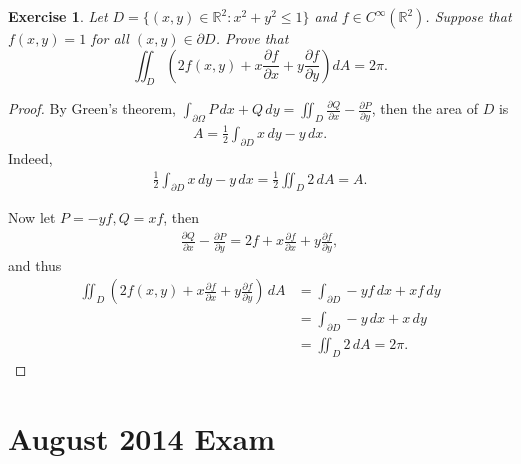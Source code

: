 \documentclass[11pt]{article}
\newtheorem{exercise}{Exercise}[section]
\theoremstyle{definition}
\numberwithin{equation}{subsection}
\begin{document}
\begin{exercise}
Let $D =\{(x, y)\in\mathbb{R}^2 : x^2 + y^2\leq 1\}$ and $f\in C^\infty(\mathbb{R}^2)$. Suppose that $f(x, y) = 1$ for all
$(x, y)\in\partial D$. Prove that
$$
\iint_D \left(2f(x,y)+x\frac{\partial f}{\partial x}+y\frac{\partial f}{\partial y}\right)dA=2\pi.
$$
\end{exercise}
\begin{proof}
By Green's theorem, $\displaystyle \int_{\partial \Omega} P\, dx + Q\, dy = \iint_D \frac{\partial Q}{\partial x} - \frac{\partial P}{\partial y}$, then the area of $D$ is 
\begin{align*}
    A = \frac{1}{2} \int_{\partial D} x\, dy - y\, dx.
\end{align*}
Indeed, 
\begin{align*}
    \frac{1}{2} \int_{\partial D} x\, dy - y\, dx = \frac{1}{2} \iint_D 2\, dA = A.
\end{align*}

Now let $P = -yf, Q = xf$, then 
\begin{align*}
    \frac{\partial Q}{\partial x} - \frac{\partial P}{\partial y} = 2f + x \frac{\partial f}{\partial x} + y \frac{\partial f}{\partial y},
\end{align*}
and thus
\begin{align*}
    \iint_D \left(2f(x,y)+x\frac{\partial f}{\partial x}+y\frac{\partial f}{\partial y}\right)\, dA & = \int_{\partial D} -yf\, dx + x f\, dy \\
    & = \int_{\partial D} -y \, dx + x \, dy \\
    & = \iint_D 2\, dA = 2\pi.
\end{align*}
\end{proof}


\newpage
\section{August 2014 Exam}
\end{document}
